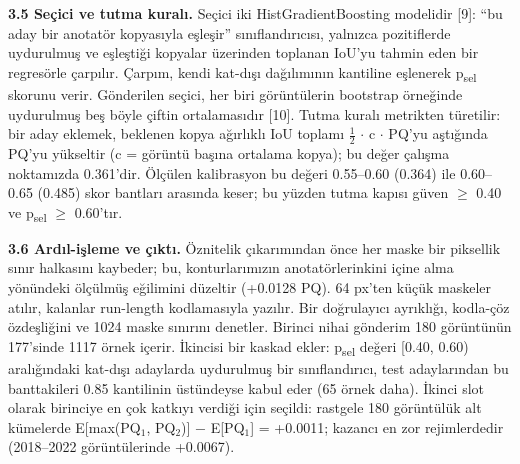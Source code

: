 \textbf{3.5 Seçici ve tutma kuralı.} Seçici iki HistGradientBoosting modelidir {[}9{]}: ``bu aday bir
anotatör kopyasıyla eşleşir'' sınıflandırıcısı, yalnızca pozitiflerde uydurulmuş ve eşleştiği
kopyalar üzerinden toplanan IoU'yu tahmin eden bir regresörle çarpılır. Çarpım, kendi kat-dışı
dağılımının kantiline eşlenerek p\textsubscript{sel} skorunu verir. Gönderilen seçici, her biri görüntülerin
bootstrap örneğinde uydurulmuş beş böyle çiftin ortalamasıdır {[}10{]}. Tutma kuralı metrikten
türetilir: bir aday eklemek, beklenen kopya ağırlıklı IoU toplamı $\tfrac12$ $\cdot$ c $\cdot$ PQ'yu aştığında PQ'yu
yükseltir (c = görüntü başına ortalama kopya); bu değer çalışma noktamızda 0.361'dir. Ölçülen
kalibrasyon bu değeri 0.55--0.60 (0.364) ile 0.60--0.65 (0.485) skor bantları arasında keser; bu
yüzden tutma kapısı güven $\geq$ 0.40 ve p\textsubscript{sel} $\geq$ 0.60'tır.

\textbf{3.6 Ardıl-işleme ve çıktı.} Öznitelik çıkarımından önce her maske bir piksellik sınır halkasını
kaybeder; bu, konturlarımızın anotatörlerinkini içine alma yönündeki ölçülmüş eğilimini düzeltir
(+0.0128 PQ). 64 px'ten küçük maskeler atılır, kalanlar run-length kodlamasıyla yazılır. Bir
doğrulayıcı ayrıklığı, kodla-çöz özdeşliğini ve 1024 maske sınırını denetler. Birinci nihai
gönderim 180 görüntünün 177'sinde 1117 örnek içerir. İkincisi bir kaskad ekler: p\textsubscript{sel} değeri
{[}0.40, 0.60) aralığındaki kat-dışı adaylarda uydurulmuş bir sınıflandırıcı, test adaylarından bu
banttakileri 0.85 kantilinin üstündeyse kabul eder (65 örnek daha). İkinci slot olarak birinciye
en çok katkıyı verdiği için seçildi: rastgele 180 görüntülük alt kümelerde
E{[}max(PQ$_1$, PQ$_2$){]} $-$ E{[}PQ$_1${]} = +0.0011; kazancı en zor rejimlerdedir (2018--2022 görüntülerinde
+0.0067).

